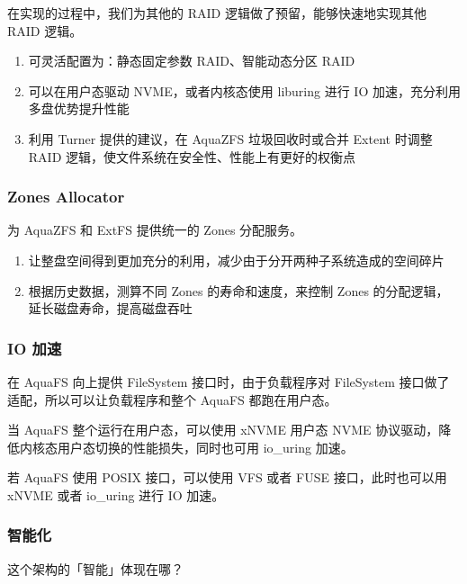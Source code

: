 在实现的过程中，我们为其他的 RAID 逻辑做了预留，能够快速地实现其他 RAID 逻辑。

\begin{enumerate}
    \item 可灵活配置为：静态固定参数 RAID、智能动态分区 RAID
    \item 可以在用户态驱动 NVME，或者内核态使用 liburing 进行 IO 加速，充分利用多盘优势提升性能
    \item 利用 Turner 提供的建议，在 AquaZFS 垃圾回收时或合并 Extent 时调整 RAID 逻辑，使文件系统在安全性、性能上有更好的权衡点
\end{enumerate}

\subsubsection*{Zones Allocator}

为 AquaZFS 和 ExtFS 提供统一的 Zones 分配服务。

\begin{enumerate}
    \item 让整盘空间得到更加充分的利用，减少由于分开两种子系统造成的空间碎片
    \item 根据历史数据，测算不同 Zones 的寿命和速度，来控制 Zones 的分配逻辑，延长磁盘寿命，提高磁盘吞吐
\end{enumerate}

\subsubsection*{IO 加速}

在 AquaFS 向上提供 FileSystem 接口时，由于负载程序对 FileSystem 接口做了适配，所以可以让负载程序和整个 AquaFS 都跑在用户态。

当 AquaFS 整个运行在用户态，可以使用 xNVME 用户态 NVME 协议驱动，降低内核态用户态切换的性能损失，同时也可用 io\_uring 加速。

若 AquaFS 使用 POSIX 接口，可以使用 VFS 或者 FUSE 接口，此时也可以用 xNVME 或者 io\_uring 进行 IO 加速。

\subsubsection*{智能化}

这个架构的「智能」体现在哪？

